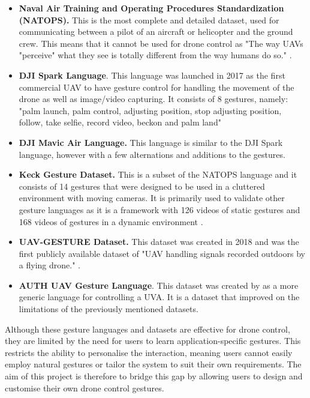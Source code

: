\begin{itemize}
    \item \textbf{Naval Air Training and Operating Procedures Standardization (NATOPS).} This is the most complete and detailed dataset, used for communicating between a pilot of an aircraft or helicopter and the ground crew. This means that it cannot be used for drone control as "The way UAVs "perceive" what they see is totally different from the way humans do so." \citep{Patrona2021}.    
    \item \textbf{DJI Spark Language}. This language was launched in 2017 as the first commercial UAV to have gesture control for handling the movement of the drone as well as image/video capturing. It consists of 8 gestures, namely: "palm launch, palm control, adjusting position, stop adjusting position, follow, take selfie, record video, beckon and palm land" 
    \item \textbf{DJI Mavic Air Language.} This language is similar to the DJI Spark language, however with a few alternations and additions to the gestures. 
    \item \textbf{Keck Gesture Dataset.} This is a subset of the NATOPS language and it consists of 14 gestures that were designed to be used in a cluttered environment with moving cameras. It is primarily used to validate other gesture languages as it is a framework with 126 videos of static gestures and 168 videos of gestures in a dynamic environment \citep{Esclara2017}. 
    \item \textbf{UAV-GESTURE Dataset.} This dataset was created in 2018 and was the first publicly available dataset of "UAV handling signals recorded outdoors by a flying drone." \citep{Patrona2021}. 
    \item \textbf{AUTH UAV Gesture Language}. This dataset was created by \cite{Patrona2021} as a more generic language for controlling a UVA. It is a dataset that improved on the limitations of the previously mentioned datasets. 
  
\end{itemize}
Although these gesture languages and datasets are effective for drone control, they are limited by the need for users to learn application-specific gestures. This restricts the ability to personalise the interaction, meaning users cannot easily employ natural gestures or tailor the system to suit their own requirements. The aim of this project is therefore to bridge this gap by allowing users to design and customise their own drone control gestures.

